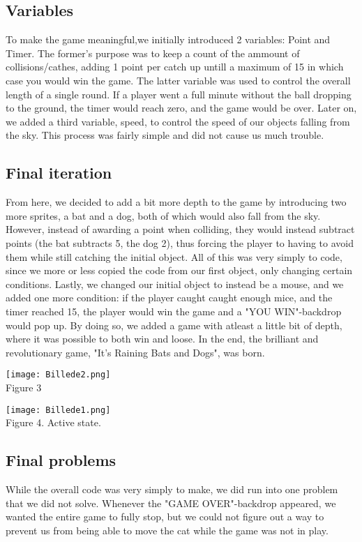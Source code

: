 \documentclass{article}
\begin{document}
\subsection{Variables} To make the game meaningful,we initially introduced 2 variables: Point and Timer. The former's purpose was to keep a count of the ammount of collisions/cathes, adding 1 point per catch up untill a maximum of 15 in which case you would win the game. The latter variable was used to control the overall length of a single round. If a player went a full minute without the ball dropping to the ground, the timer would reach zero, and the game would be over. Later on, we added a third variable, speed, to control the speed of our objects falling from the sky. This process was fairly simple and did not cause us much trouble.
\subsection{Final iteration}
From here, we decided to add a bit more depth to the game by introducing two more sprites, a bat and a dog, both of which would also fall from the sky. However, instead of awarding a point when colliding, they would instead subtract points (the bat subtracts 5, the dog 2), thus forcing the player to having to avoid them while still catching the initial object. All of this was very simply to code, since we more or less copied the code from our first object, only changing certain conditions. Lastly, we changed our initial object to instead be a mouse, and we added one more condition: if the player caught caught enough mice, and the timer reached 15, the player would win the game and a "YOU WIN"-backdrop would pop up. By doing so, we added a game with atleast a little bit of depth, where it was possible to both win and loose. In the end, the brilliant and revolutionary game, "It's Raining Bats and Dogs", was born.
\newline
\begin{center}
  \texttt{[image: Billede2.png]}
  \\Figure 3
\end{center}
\begin{center}
  \texttt{[image: Billede1.png]}
  \\Figure 4. Active state.
\end{center}
\subsection{Final problems}
While the overall code was very simply to make, we did run into one problem that we did not solve. Whenever the "GAME OVER"-backdrop appeared, we wanted the entire game to fully stop, but we could not figure out a way to prevent us from being able to move the cat while the game was not in play.
\end{document}
